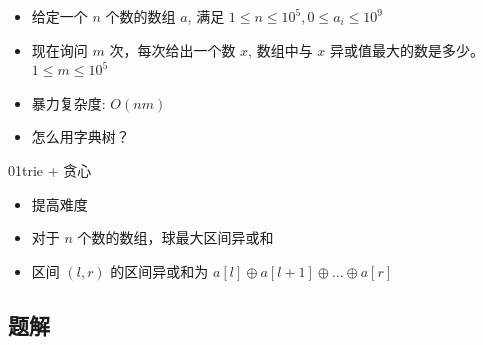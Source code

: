 \begin{frame}
\begin{itemize}
    \item 给定一个 $n$ 个数的数组 $a$, 满足 $1\leq n\leq 10^5, 0\leq a_i\leq 10^9$
    \item 现在询问 $m$ 次，每次给出一个数 $x$, 数组中与 $x$ 异或值最大的数是多少。$1\leq m\leq 10^5$
\end{itemize}
\end{frame}

\begin{frame}
\begin{itemize}
    \item 暴力复杂度: $O(nm)$
    \item 怎么用字典树？
\end{itemize}
\end{frame}

\begin{frame}
\begin{center}
01trie + 贪心
\end{center}
\end{frame}

\begin{frame}
\begin{itemize}
    \item 提高难度
    \item 对于 $n$ 个数的数组，球最大区间异或和
    \item 区间 $(l, r)$ 的区间异或和为 $a[l]\oplus a[l + 1]\oplus ...\oplus a[r]$
\end{itemize}
\end{frame}

\subsection{题解}
% 
% 
% 
% 
% 
% 
